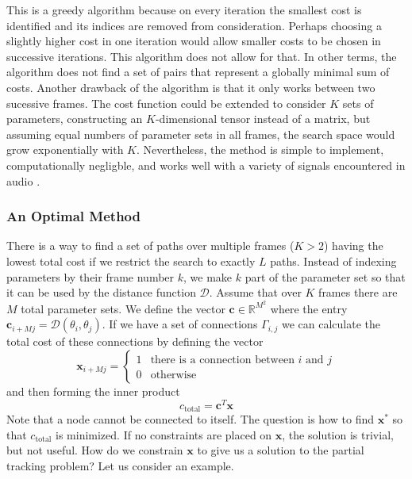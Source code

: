 \documentclass[letterpaper,12pt]{report}
\begin{document}
This is a greedy algorithm because on every iteration the smallest cost is
identified and its indices are removed from consideration. Perhaps choosing a
slightly higher cost in one iteration would allow smaller costs to be chosen in
successive iterations. This algorithm does not allow for that. In other terms,
the algorithm does not find a set of pairs that represent a globally minimal sum of
costs.
Another drawback of the algorithm is that it only works between two sucessive
frames. The cost function could be extended to consider $K$ sets of parameters,
constructing an $K$-dimensional tensor instead of a matrix, but assuming equal
numbers of parameter sets in all frames, the search space would grow exponentially
with $K$. Nevertheless, the method is simple to implement, computationally
negligble, and works well with a variety of signals encountered in audio
\cite{mcaulay1986speech} \cite{smith1987parshl}.

\subsubsection{An Optimal Method}

There is a way to find a set of paths over multiple frames ($K > 2$) having the
lowest total cost if
we restrict the search to exactly $L$ paths. Instead of indexing parameters by
their frame number $k$, we make $k$ part of the parameter set so that it can be
used by the distance function $\mathcal{D}$. Assume that over $K$ frames there
are $M$ total parameter sets. We define the vector $\boldsymbol{c} \in \mathbb{R}^{M^2}$
where the entry $\boldsymbol{c}_{i + Mj} = \mathcal{D} \left( \theta_{i}, \theta_{j}
\right)$. If we have a set of connections $\Gamma_{i,j}$ we can calculate the
total cost of these connections by defining the vector
\[
    \boldsymbol{x}_{i + Mj} = \begin{cases}
        1 & \text{there is a connection between }i\text{ and }j\\
        0 & \text{otherwise}
    \end{cases}
\]
and then forming the inner product
\[
    c_{\text{total}}=\boldsymbol{c}^{T}\boldsymbol{x}
\]
Note that a node cannot be connected to itself. The question is how to find
$\boldsymbol{x}^{\ast}$ so that $c_{\text{total}}$ is minimized. If no
constraints are placed on $\boldsymbol{x}$, the solution is trivial, but not
useful. How do we constrain $\boldsymbol{x}$ to give us a solution to the
partial tracking problem? Let us consider an example.
\end{document}
